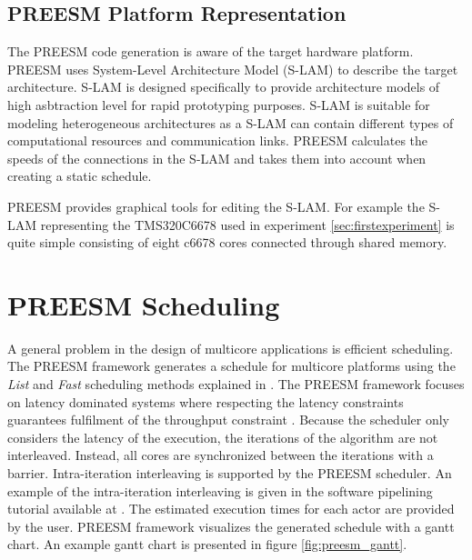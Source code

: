 \subsection{PREESM Platform Representation}
The PREESM code generation is aware of the target hardware platform. PREESM
uses System-Level Architecture Model (S-LAM) \cite{pelcat2009system} to
describe the target architecture. S-LAM is designed specifically to provide
architecture models of high asbtraction level for rapid prototyping purposes.
S-LAM is suitable for modeling heterogeneous architectures as a S-LAM can
contain different types of computational resources and communication links.
PREESM calculates the speeds of the connections in the S-LAM and takes them into
account when creating a static schedule. \cite{pelcat2009system}

PREESM provides graphical tools for editing the S-LAM. For example the S-LAM
representing the TMS320C6678 used in experiment \ref{sec:firstexperiment} is
quite simple consisting of eight c6678 cores connected through shared memory.

\section{PREESM Scheduling}
\label{sec:preesmsched}
A general problem in the design of multicore applications is efficient
scheduling. The PREESM framework generates a schedule for multicore platforms
using the \textit{List} and \textit{Fast} scheduling methods explained in
\cite{kwok1997high}. The PREESM framework focuses on latency dominated systems
where respecting the latency constraints guarantees fulfilment of the throughput
constraint \cite{pelcat2014preesm, ghamarian2006throughput}. Because the
scheduler only considers the latency of the execution, the iterations of the
algorithm are not interleaved. Instead, all cores are synchronized between the
iterations with a barrier. Intra-iteration interleaving is supported by the
PREESM scheduler. \cite{pelcat2014preesm} An example of the intra-iteration
interleaving is given in the software pipelining tutorial available at
\cite{preesm}. The estimated execution times for each actor are provided by the
user. PREESM framework visualizes the generated schedule with a gantt chart. An
example gantt chart is presented in figure \ref{fig:preesm_gantt}.\\
